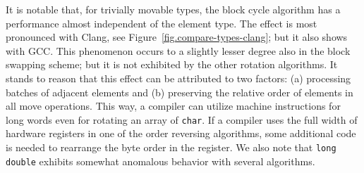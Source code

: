 \documentclass[12pt,a4paper]{article}
\begin{document}
  It is notable that, for trivially movable types, the block cycle
  algorithm has a performance almost independent of the element type.
  The effect is most pronounced with Clang, see
  Figure~\ref{fig.compare-types-clang}; but it also shows with {\small
    GCC}. This phenomenon occurs to a slightly lesser degree also in the
  block swapping scheme; but it is not exhibited by the other rotation
  algorithms. It stands to reason that this effect can be attributed to
  two factors: (a) processing batches of adjacent elements and (b)
  preserving the relative order of elements in all move operations. This
  way, a compiler can utilize machine instructions for long words even
  for rotating an array of \verb+char+. If a compiler uses the full
  width of hardware registers in one of the order reversing algorithms,
  some additional code is needed to rearrange the byte order in the
  register.  We also note that \verb+long double+ exhibits somewhat
  anomalous behavior with several algorithms.


  
  
\end{document}
